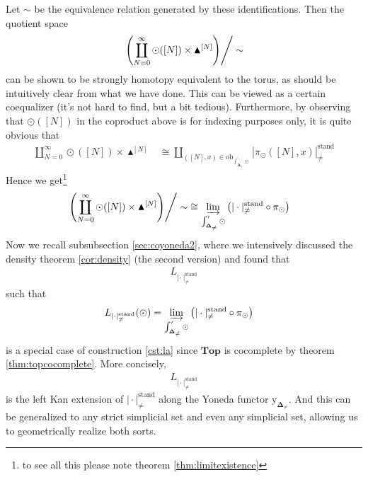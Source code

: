 Let $\sim$ be the equivalence relation generated by these identifications.
Then the quotient space
\begin{align*}
  \left.
    \left(
      \coprod_{N=0}^{\infty}
      \odot([N])
      \times
      \blacktriangle^{[N]}
    \right)
  \right\slash
  \sim
\end{align*}
can be shown to be strongly homotopy equivalent to the torus, as should be intuitively clear from what we have done.
This can be viewed as a certain coequalizer (it's not hard to find, but a bit tedious).
Furthermore, by observing that $\odot([N])$ in the coproduct above is for indexing purposes only, it is quite obvious that
\begin{align*}
  \coprod_{N=0}^{\infty}
  \odot([N])
  \times
  \blacktriangle^{[N]}
  &\cong
  \coprod_{([N],x) \in \mathrm{ob}_{\int_{\mathbf{\Delta}_{\neq}}^{\prime}\odot}}
  \left\vert
    \pi_{\odot}([N],x)
  \right\vert_{\neq}^{\textrm{stand}}
\end{align*}
Hence we get\footnote{to see all this please note theorem \ref{thm:limitexistence}}
\begin{align*}
  \left.
    \left(
      \coprod_{N=0}^{\infty}
      \odot([N])
      \times
      \blacktriangle^{[N]}
    \right)
  \right\slash
  \sim
  &\cong
  \varinjlim_{\int_{\mathbf{\Delta}_{\neq}}^{\prime}\odot}
  \left(
    \vert
      \cdot
    \vert_{\neq}^{\textrm{stand}}
    \circ
    \pi_{\odot}
  \right)
\end{align*}
Now we recall subsubsection \ref{sec:coyoneda2}, where we intensively discussed the density theorem \ref{cor:density} (the second version) and found that
\begin{align*}
  L_{\vert \cdot \vert_{\neq}^{\textrm{stand}}}
\end{align*}
such that
\begin{align*}
  L_{\vert \cdot \vert_{\neq}^{\textrm{stand}}}
  (\odot)
  &=
  \varinjlim_{\int_{\mathbf{\Delta}_{\neq}}^{\prime}\odot}
  \left(
    \vert
      \cdot
    \vert_{\neq}^{\textrm{stand}}
    \circ
    \pi_{\odot}
  \right)
\end{align*}
is a special case of construction \ref{cst:la} since $\mathbf{Top}$ is cocomplete by theorem \ref{thm:topcocomplete}.
More concisely,
\begin{align*}
  L_{\vert \cdot \vert_{\neq}^{\textrm{stand}}}
\end{align*}
is the left Kan extension of $\vert \cdot \vert_{\neq}^{\textrm{stand}}$ along the Yoneda functor $\mathrm{y}_{\mathbf{\Delta}_{\neq}}$.
And this can be generalized to any strict simplicial set and even any simplicial set, allowing us to geometrically realize both sorts.
